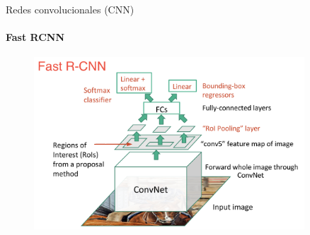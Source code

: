 \documentclass[presentation, t]{beamer}
\begin{document}
\begin{frame}[label={sec:orgba9caee}]{Redes convolucionales (CNN)}
\framesubtitle{Fast RCNN}

\vfill

\begin{figure}[htbp]
\centering
\includegraphics[width=0.90\textwidth]{./imagenes/fast-rcnn.png}
\end{figure}\vfill
\end{frame}
\end{document}
